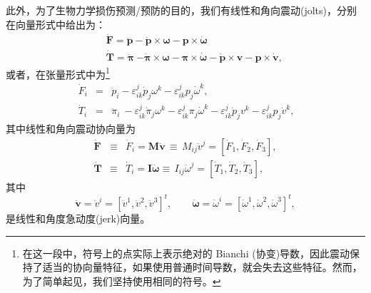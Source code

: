 \documentclass[11pt,fontset=founder]{ctexart}
\begin{document}
此外，为了生物力学损伤预测/预防的目的，我们有线性和角向震动(jolts)，分别在向量形式中给出为：
\begin{eqnarray*}
~&&\boldsymbol{\dot{\mathbf{F}}=\ddot{\mathbf{p}}-\dot{\mathbf{p}}\times \omega -p\times \dot{\omega}}\qquad
\\
~&&\boldsymbol{\dot{\mathbf{T}}=\ddot{\pi}}~\boldsymbol{-\dot{\pi}\times \omega -\pi \times
\dot{\omega}-\dot{\mathbf p}\times \mathbf v - \mathbf p\times \dot{\mathbf v}},
\end{eqnarray*}
或者，在张量形式中为\footnote{%
在这一段中，符号上的点实际上表示绝对的 Bianchi (协变)导数，因此震动保持了适当的协向量特征，如果使用普通时间导数，就会失去这些特征。然而，为了简单起见，我们坚持使用相同的符号。}
\begin{eqnarray*}
~\dot{F}_{i} &=&\ddot{p}_{i}-\varepsilon _{ik}^{j}\dot{p}_{j}{\omega }%
^{k}-\varepsilon _{ik}^{j}p_{j}{\dot{\omega}}^{k}, \\
~\dot{T}_{{i}} &=&\ddot{\pi}_{i}~-\varepsilon _{ik}^{j}\dot{\pi}_{j}\omega
^{k}-\varepsilon _{ik}^{j}\pi _{j}{\dot{\omega}}^{k}-\varepsilon _{ik}^{j}%
\dot{p}_{j}v^{k}-\varepsilon _{ik}^{j}p_{j}\dot{v}^{k},
\end{eqnarray*}
其中线性和角向震动协向量为
\begin{eqnarray*}
\boldsymbol{\dot{\mathbf F}} &\equiv &\dot{F}_{i}=\mathbf{M\boldsymbol{\ddot{\mathbf v}}}\,\equiv \mathbf{\,}%
M_{ij}\ddot{v}^{j}=[\dot{F}_{1},\dot{F}_{2},\dot{F}_{3}], \\
\boldsymbol{\dot{\mathbf T}} &\equiv &\dot{T}_{{i}}=\mathbf{I\boldsymbol{\ddot{\omega}}\equiv \,}%
I_{ij}\ddot{\omega}^{j}=[\dot{T}_{{1}},\dot{T}_{{2}},\dot{T}_{{3}}],
\end{eqnarray*}
其中
\begin{equation*}
\boldsymbol{\ddot{\mathbf v}}=\ddot{v}^{{i}}=[\ddot{v}^{{1}},\ddot{v}^{{2}},\ddot{v}^{{3}%
}]^{t},\qquad \boldsymbol{\ddot{\omega}}=\ddot{\omega}^{{i}}=[\ddot{\omega}^{{1}%
},\ddot{\omega}^{{2}},\ddot{\omega}^{{3}}]^{t},
\end{equation*}
是线性和角度急动度(jerk)向量。
\end{document}
